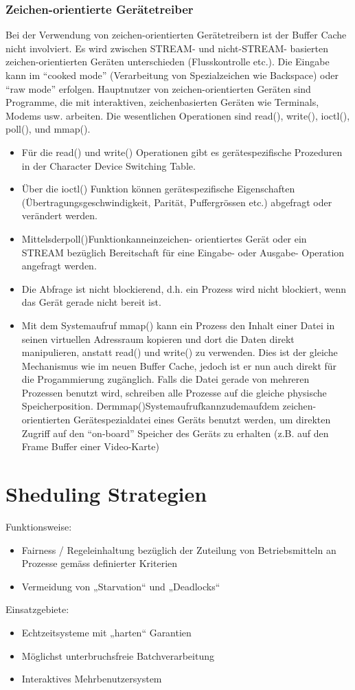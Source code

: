 \documentclass[a4paper, 10pt]{article}
\begin{document}
\subsubsection{Zeichen-orientierte Gerätetreiber}
Bei der Verwendung von zeichen-orientierten Gerätetreibern ist der Buffer Cache nicht involviert. Es wird zwischen STREAM- und nicht-STREAM- basierten zeichen-orientierten Geräten unterschieden (Flusskontrolle etc.). Die Eingabe kann im “cooked mode” (Verarbeitung von Spezialzeichen wie Backspace) oder “raw mode” erfolgen. Hauptnutzer von zeichen-orientierten Geräten sind Programme, die mit interaktiven, zeichenbasierten Geräten wie Terminals, Modems usw. arbeiten. Die wesentlichen Operationen sind read(), write(), ioctl(), poll(), und mmap().
\begin{itemize}
	\item Für die read() und write() Operationen gibt es gerätespezifische Prozeduren in der Character Device Switching Table.
	\item \"Uber die ioctl() Funktion können gerätespezifische Eigenschaften (Übertragungsgeschwindigkeit, Parität, Puffergrössen etc.) abgefragt oder verändert werden.
	\item Mittelsderpoll()Funktionkanneinzeichen- orientiertes Gerät oder ein STREAM bezüglich Bereitschaft für eine Eingabe- oder Ausgabe- Operation angefragt werden.
	\item Die Abfrage ist nicht blockierend, d.h. ein Prozess wird nicht blockiert, wenn das Gerät gerade nicht bereit ist.
	\item Mit dem Systemaufruf mmap() kann ein Prozess den Inhalt einer Datei in seinen virtuellen Adressraum kopieren und dort die Daten direkt manipulieren, anstatt read() und write() zu verwenden. Dies ist der gleiche Mechanismus wie im neuen Buffer Cache, jedoch ist er nun auch direkt für die Progammierung zugänglich. Falls die Datei gerade von mehreren Prozessen benutzt wird, schreiben alle Prozesse auf die gleiche physische Speicherposition. Dermmap()Systemaufrufkannzudemaufdem zeichen-orientierten Gerätespezialdatei eines Geräts benutzt werden, um direkten Zugriff auf den “on-board” Speicher des Geräts zu erhalten (z.B. auf den Frame Buffer einer Video-Karte)
\end{itemize}

\newpage
\section{Sheduling Strategien}
Funktionsweise:
\begin{itemize}
\item Fairness / Regeleinhaltung bez\"uglich der Zuteilung von Betriebsmitteln an Prozesse gem\"ass definierter Kriterien
\item Vermeidung von „Starvation“ und „Deadlocks“
\end{itemize}
Einsatzgebiete:
\begin{itemize}
\item Echtzeitsysteme mit „harten“ Garantien
\item M\"oglichst unterbruchsfreie Batchverarbeitung
\item Interaktives Mehrbenutzersystem
\end{itemize}
\end{document}
